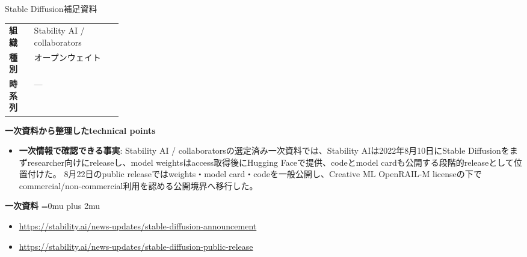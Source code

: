 \begin{technicalnote}{Stable Diffusion}{補足資料}
\begingroup
\begin{tabularx}{\linewidth}{@{}>{\bfseries}p{0.22\linewidth}X@{}}
組織 & Stability AI / collaborators \\
種別 & オープンウェイト \\
時系列 & — \\
\end{tabularx}
\smallskip
{\bfseries 一次資料から整理したtechnical points}
\begin{itemize}[leftmargin=1.5em,itemsep=0.35em]
\item \textbf{一次情報で確認できる事実}: Stability AI / collaboratorsの選定済み一次資料では、Stability AIは2022年8月10日にStable Diffusionをまずresearcher向けにreleaseし、model weightsはaccess取得後にHugging Faceで提供、codeとmodel cardも公開する段階的releaseとして位置付けた。 8月22日のpublic releaseではweights・model card・codeを一般公開し、Creative ML OpenRAIL-M licenseの下でcommercial/non-commercial利用を認める公開境界へ移行した。
\end{itemize}
\begin{minipage}{\linewidth}
\begin{samepage}
{\bfseries 一次資料}
\begingroup\sloppy
\Urlmuskip=0mu plus 2mu\relax
\begin{itemize}[leftmargin=1.5em,itemsep=0.25em]
\item {\scriptsize\url{https://stability.ai/news-updates/stable-diffusion-announcement}}
\item {\scriptsize\url{https://stability.ai/news-updates/stable-diffusion-public-release}}
\end{itemize}
\endgroup
\end{samepage}
\end{minipage}
\endgroup
\end{technicalnote}
\medskip

